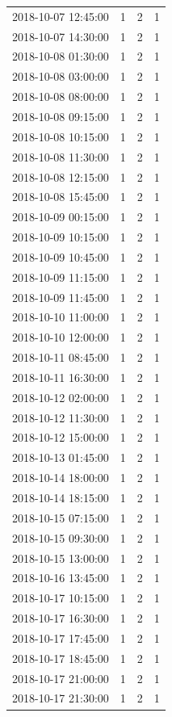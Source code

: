 \begin{tabular}{lrrr}
2018-10-07 12:45:00 & 1 & 2 & 1 \\
2018-10-07 14:30:00 & 1 & 2 & 1 \\
2018-10-08 01:30:00 & 1 & 2 & 1 \\
2018-10-08 03:00:00 & 1 & 2 & 1 \\
2018-10-08 08:00:00 & 1 & 2 & 1 \\
2018-10-08 09:15:00 & 1 & 2 & 1 \\
2018-10-08 10:15:00 & 1 & 2 & 1 \\
2018-10-08 11:30:00 & 1 & 2 & 1 \\
2018-10-08 12:15:00 & 1 & 2 & 1 \\
2018-10-08 15:45:00 & 1 & 2 & 1 \\
2018-10-09 00:15:00 & 1 & 2 & 1 \\
2018-10-09 10:15:00 & 1 & 2 & 1 \\
2018-10-09 10:45:00 & 1 & 2 & 1 \\
2018-10-09 11:15:00 & 1 & 2 & 1 \\
2018-10-09 11:45:00 & 1 & 2 & 1 \\
2018-10-10 11:00:00 & 1 & 2 & 1 \\
2018-10-10 12:00:00 & 1 & 2 & 1 \\
2018-10-11 08:45:00 & 1 & 2 & 1 \\
2018-10-11 16:30:00 & 1 & 2 & 1 \\
2018-10-12 02:00:00 & 1 & 2 & 1 \\
2018-10-12 11:30:00 & 1 & 2 & 1 \\
2018-10-12 15:00:00 & 1 & 2 & 1 \\
2018-10-13 01:45:00 & 1 & 2 & 1 \\
2018-10-14 18:00:00 & 1 & 2 & 1 \\
2018-10-14 18:15:00 & 1 & 2 & 1 \\
2018-10-15 07:15:00 & 1 & 2 & 1 \\
2018-10-15 09:30:00 & 1 & 2 & 1 \\
2018-10-15 13:00:00 & 1 & 2 & 1 \\
2018-10-16 13:45:00 & 1 & 2 & 1 \\
2018-10-17 10:15:00 & 1 & 2 & 1 \\
2018-10-17 16:30:00 & 1 & 2 & 1 \\
2018-10-17 17:45:00 & 1 & 2 & 1 \\
2018-10-17 18:45:00 & 1 & 2 & 1 \\
2018-10-17 21:00:00 & 1 & 2 & 1 \\
2018-10-17 21:30:00 & 1 & 2 & 1 \\

\end{tabular}
